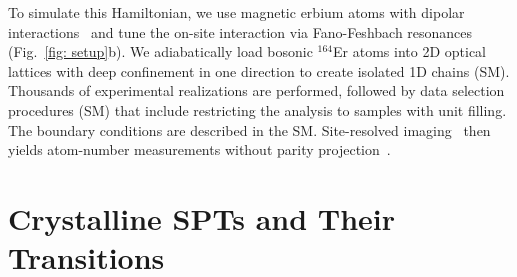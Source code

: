 \documentclass[preprint,superscriptaddress,floatfix, nofootinbib]{revtex4-2}
\begin{document}
To simulate this Hamiltonian, we use magnetic erbium atoms with dipolar interactions~\cite{Su2023} and tune the on-site interaction via Fano-Feshbach resonances~\cite{Chin2010} (Fig.~\ref{fig: setup}b). We adiabatically load bosonic $^{164}$Er atoms into 2D optical lattices with deep confinement in one direction to create isolated 1D chains (SM). Thousands of experimental realizations are performed, followed by data selection procedures (SM) that include restricting the analysis to samples with unit filling. The boundary conditions are described in the SM. Site-resolved imaging~\cite{Bakr2010, Sherson2010} then yields atom-number measurements without parity projection~\cite{Su2024}.


\section{Crystalline SPTs and Their Transitions} \label{sec:CSPT-transitions}
\end{document}
